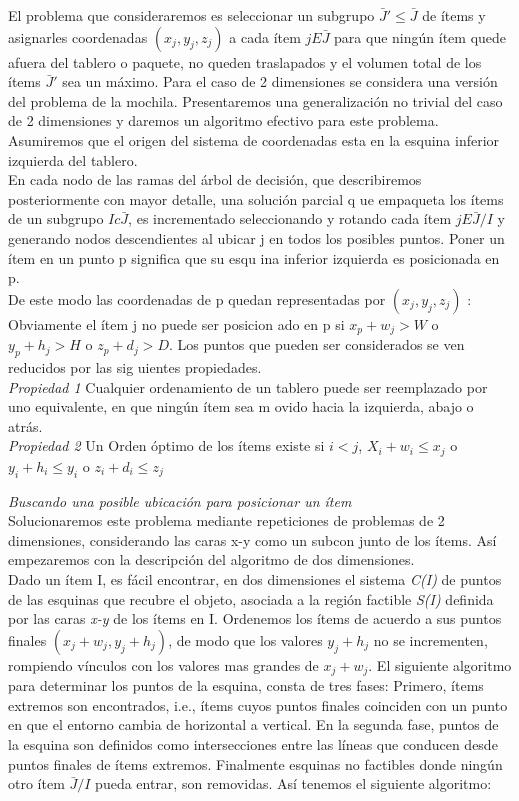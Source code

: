 El problema que consideraremos es seleccionar un subgrupo \(\bar{J}'\le\bar{J}\) de ítems y asignarles coordenadas \((x_j,
y_j, z_j)\) a cada ítem \(j E \bar{J}\) para que ningún ítem quede afuera del tablero o paquete, no queden traslapados y el
 volumen total de los ítems \(\bar{J}'\) sea un máximo. Para el caso de 2 dimensiones se considera una versión del problema
 de la mochila. Presentaremos una generalización no trivial del caso de 2 dimensiones y daremos un algoritmo efectivo para
este problema. Asumiremos que el origen del sistema de coordenadas esta en la esquina inferior izquierda del tablero.\\
En cada nodo de las ramas del árbol de decisión, que describiremos posteriormente con mayor detalle, una solución parcial q
ue empaqueta los ítems de un subgrupo \(I c \bar{J}\), es incrementado seleccionando y rotando cada ítem \(j E \bar{J}/I\)
y generando nodos descendientes al ubicar j en todos los posibles puntos. Poner un ítem en un punto p significa que su esqu
ina inferior izquierda es posicionada en p.\\

De este modo las coordenadas de p quedan representadas por \((x_j, y_j, z_j)\) : Obviamente el ítem j no puede ser posicion
ado en p si
\(x_p + w_j > W\) o \(y_p + h_j >H\) o \( z_p+d_j >D\). Los puntos que pueden ser considerados se ven reducidos por las sig
uientes propiedades.\\

\emph{Propiedad 1} Cualquier ordenamiento de un tablero puede ser reemplazado por uno equivalente, en que ningún ítem sea m
ovido hacia la izquierda, abajo o atrás.\\
\emph{Propiedad 2} Un Orden óptimo de los ítems existe si \(i < j\), \(X_i + w_i \le x_j\) o \(y_i + h_i \le y_i\) o \(z_i
+ d_i \le z_j\)

\emph{Buscando una posible ubicación para posicionar un ítem} \\

Solucionaremos este problema mediante repeticiones de problemas de 2 dimensiones, considerando las caras x-y como un subcon
junto de los ítems. Así empezaremos con la descripción del algoritmo de dos dimensiones.\\
Dado un ítem I, es fácil encontrar, en dos dimensiones el sistema \emph{C(I)} de puntos de las esquinas que recubre el objeto, asociada a la región factible \emph{S(I)} definida por las caras \emph{x-y} de los ítems en I. Ordenemos los ítems de acuerdo a sus puntos finales \((x_j+w_j,y_j+h_j)\), de modo que los valores \(y_j+h_j\) no se incrementen, rompiendo vínculos con los valores mas grandes de \(x_j+w_j\). El siguiente algoritmo para determinar los puntos de la esquina, consta de tres fases: Primero, ítems extremos son encontrados, i.e., ítems cuyos puntos finales coinciden con un punto en que el entorno cambia de horizontal a vertical. En la segunda fase, puntos de la esquina son definidos como intersecciones entre las líneas que conducen desde puntos finales de ítems extremos. Finalmente esquinas no factibles donde ningún otro ítem \(\bar{J}/I\) pueda entrar, son removidas. Así tenemos el siguiente algoritmo:\\

